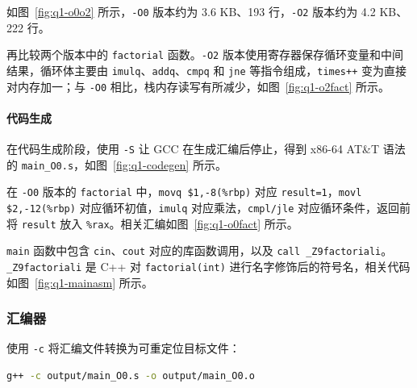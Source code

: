 如图~\ref{fig:q1-o0o2} 所示，\texttt{-O0} 版本约为 3.6 KB、193 行，\texttt{-O2} 版本约为 4.2 KB、222 行。


再比较两个版本中的 \texttt{factorial} 函数。\texttt{-O2} 版本使用寄存器保存循环变量和中间结果，循环体主要由 \texttt{imulq}、\texttt{addq}、\texttt{cmpq} 和 \texttt{jne} 等指令组成，\texttt{times++} 变为直接对内存加一；与 \texttt{-O0} 相比，栈内存读写有所减少，如图~\ref{fig:q1-o2fact} 所示。



\paragraph{代码生成}

在代码生成阶段，使用 \texttt{-S} 让 GCC 在生成汇编后停止，得到 x86-64 AT\&T 语法的 \texttt{main\_O0.s}，如图~\ref{fig:q1-codegen} 所示。


在 \texttt{-O0} 版本的 \texttt{factorial} 中，\texttt{movq \$1,-8(\%rbp)} 对应 \texttt{result=1}，\texttt{movl \$2,-12(\%rbp)} 对应循环初值，\texttt{imulq} 对应乘法，\texttt{cmpl/jle} 对应循环条件，返回前将 \texttt{result} 放入 \texttt{\%rax}。相关汇编如图~\ref{fig:q1-o0fact} 所示。


\texttt{main} 函数中包含 \texttt{cin}、\texttt{cout} 对应的库函数调用，以及 \texttt{call \_Z9factoriali}。\texttt{\_Z9factoriali} 是 C++ 对 \texttt{factorial(int)} 进行名字修饰后的符号名，相关代码如图~\ref{fig:q1-mainasm} 所示。



\subsubsection{汇编器}

使用 \texttt{-c} 将汇编文件转换为可重定位目标文件：

\begin{lstlisting}[language=bash]
g++ -c output/main_O0.s -o output/main_O0.o
\end{lstlisting}

